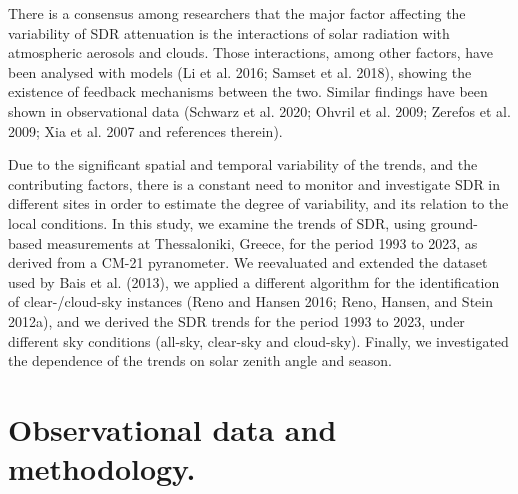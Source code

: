 \documentclass[
  preprint, 3p, authoryear]{article}
\begin{document}
There is a consensus among researchers that the major factor affecting the variability of SDR attenuation is the interactions of solar radiation with atmospheric aerosols and clouds.
Those interactions, among other factors, have been analysed with models (Li et al. 2016; Samset et al. 2018), showing the existence of feedback mechanisms between the two.
Similar findings have been shown in observational data (Schwarz et al. 2020; Ohvril et al. 2009; Zerefos et al. 2009; Xia et al. 2007 and references therein).

Due to the significant spatial and temporal variability of the trends, and the contributing factors, there is a constant need to monitor and investigate SDR in different sites in order to estimate the degree of variability, and its relation to the local conditions.
In this study, we examine the trends of SDR, using ground-based measurements at Thessaloniki, Greece, for the period 1993 to 2023, as derived from a CM-21 pyranometer.
We reevaluated and extended the dataset used by Bais et al. (2013), we applied a different algorithm for the identification of clear-/cloud-sky instances (Reno and Hansen 2016; Reno, Hansen, and Stein 2012a), and we derived the SDR trends for the period 1993 to 2023, under different sky conditions (all-sky, clear-sky and cloud-sky).
Finally, we investigated the dependence of the trends on solar zenith angle and season.

\hypertarget{observational-data-and-methodology.}{%
\section{Observational data and methodology.}\label{observational-data-and-methodology.}}
\end{document}
